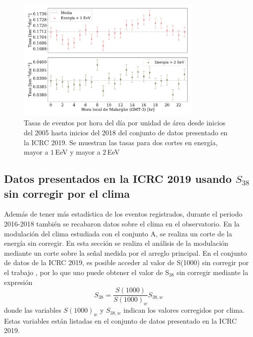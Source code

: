    \begin{figure}[H]
       \centering
      \includegraphics[width=0.8\textwidth]{Graphs/rate_hour_of_the_day/herald_above_1EeV_and_2EeV_hour_of_the_day.pdf}
       \caption{Tasas de eventos  por hora del día por unidad de área desde inicios del 2005 hasta inicios del 2018 del conjunto de datos presentado en la ICRC 2019.  Se muestran las tasas para dos cortes en energía, mayor a $1\,$EeV y mayor a $2\,$EeV}\label{fig:rate_new_18_2EeV}
   \end{figure}


\subsection{Datos presentados en la ICRC 2019 usando $S_{38}$ sin corregir por el clima} \label{sin_corregir_s38}


Además de tener más estadística de los eventos registrados, durante el periodo 2016-2018 también se recabaron datos sobre el clima en el observatorio. En la modulación del clima estudiada con el conjunto A, se  realiza un corte de la energía sin corregir. En esta sección se realiza el análisis de la modulación mediante un  corte sobre la señal medida por el arreglo principal. En el conjunto de datos de la ICRC 2019, es posible acceder al valor de S(1000) sin corregir por el trabajo \cite{aab2017impact}, por lo que uno puede obtener el valor de S$_{38}$ sin corregir mediante la expresión
\begin{equation}
S_{38} = \frac{S(1000)}{S(1000)_w}S_{38,w}
\label{eq:s38_w}
\end{equation}
donde las variables $S(1000)_w$ y $S_{38,w}$ indican los valores corregidos por clima. Estas variables están listadas en el conjunto de datos presentado en la ICRC 2019. 

